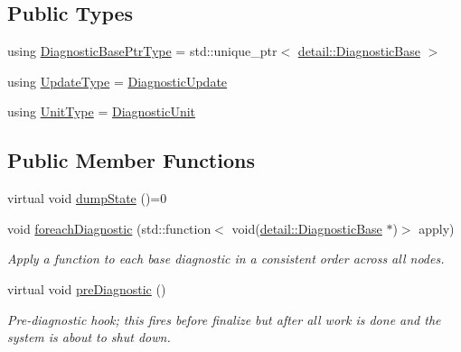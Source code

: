 \subsection*{Public Types}
\begin{DoxyCompactItemize}
\item 
using \hyperlink{structvt_1_1runtime_1_1component_1_1_diagnostic_ad95ea698535524d0f82c5da9beaaaf37}{Diagnostic\+Base\+Ptr\+Type} = std\+::unique\+\_\+ptr$<$ \hyperlink{structvt_1_1runtime_1_1component_1_1detail_1_1_diagnostic_base}{detail\+::\+Diagnostic\+Base} $>$
\item 
using \hyperlink{structvt_1_1runtime_1_1component_1_1_diagnostic_a75e737294bb63e1898d9ac4515f0cf63}{Update\+Type} = \hyperlink{namespacevt_1_1runtime_1_1component_a896637e6e183a909a17bfd8d3943c206}{Diagnostic\+Update}
\item 
using \hyperlink{structvt_1_1runtime_1_1component_1_1_diagnostic_a2bcd1016fcdb6395844d4fd15d84a570}{Unit\+Type} = \hyperlink{namespacevt_1_1runtime_1_1component_a99ec18b08862c712176126bb7d0e307a}{Diagnostic\+Unit}
\end{DoxyCompactItemize}
\subsection*{Public Member Functions}
\begin{DoxyCompactItemize}
\item 
virtual void \hyperlink{structvt_1_1runtime_1_1component_1_1_diagnostic_a1b6da987a14917c7ee8a4d00138e62e6}{dump\+State} ()=0
\item 
void \hyperlink{structvt_1_1runtime_1_1component_1_1_diagnostic_a1d6951af40ad0b4020860c0b21b1a85c}{foreach\+Diagnostic} (std\+::function$<$ void(\hyperlink{structvt_1_1runtime_1_1component_1_1detail_1_1_diagnostic_base}{detail\+::\+Diagnostic\+Base} $\ast$)$>$ apply)
\begin{DoxyCompactList}\small\item\em Apply a function to each base diagnostic in a consistent order across all nodes. \end{DoxyCompactList}\item 
virtual void \hyperlink{structvt_1_1runtime_1_1component_1_1_diagnostic_a4e64b5a12ffc1874065aa8b09e6309a9}{pre\+Diagnostic} ()
\begin{DoxyCompactList}\small\item\em Pre-\/diagnostic hook; this fires before finalize but after all work is done and the system is about to shut down. \end{DoxyCompactList}\end{DoxyCompactItemize}
